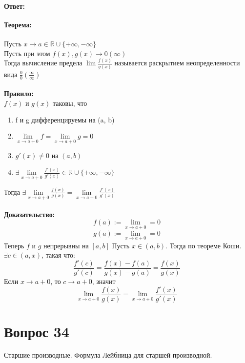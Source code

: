 \documentclass{article}
\DeclareMathOperator{\Exists}{\exists}
\begin{document}
\subsection*{Ответ:}
\textbf{Теорема:}\\\\
Пусть $x\rightarrow a \in \mathbb{R}\cup\{+\infty,-\infty\}$\\
Пусть при этом $f(x), g(x) \rightarrow 0 (\infty)$\\
Тогда вычисление предела $\lim \frac{f(x)}{g(x)}$ называется раскрытием неопределенности вида $\frac00 (\frac{\infty}{\infty})$\\\\
\textbf{Правило:}\\
$f(x)$ и $g(x)$ таковы, что
\begin{enumerate}
   \item f и g дифференцируемы на (a, b)
   \item $\lim\limits_{x \to a+0}f=\lim\limits_{x\to a+0}g=0$
   \item $g'(x)\ne 0$ на $(a,b)$
   \item $\Exists \lim\limits_{x\to a+0} \frac{f'(x)}{g'(x)}\in \mathbb{R}\cup\{+\infty,-\infty\}$
\end{enumerate}
Тогда $\Exists \lim\limits_{x\to a+0}\frac{f(x)}{g(x)} = \lim\limits_{x\to a+0}\frac{f'(x)}{g'(x)}$\\\\
\textbf{Доказательство:}\\
$$f(a):=\lim_{x\to a+0}=0$$
$$g(a):=\lim_{x\to a+0}=0$$
Теперь $f$ и $g$ непрерывны на $[a,b]$
Пусть $x \in (a,b)$. Тогда по теореме Коши.
$\Exists c\in (a,x)$, такая что:
$$\frac{f'(c)}{g'(c)}=\frac{f(x)-f(a)}{g(x)-g(a)}=\frac{f(x)}{g(x)}$$
Если $x\to a+0$, то $c\to a+0$, значит
$$\lim_{x\to a+0}\frac{f(x)}{g(x)}=\lim_{x\to a+0}\frac{f'(x)}{g'(x)}$$
 
\part*{Вопрос 34}
\begin{center}
Старшие производные. Формула Лейбница для старшей производной.
\end{center}
\end{document}
